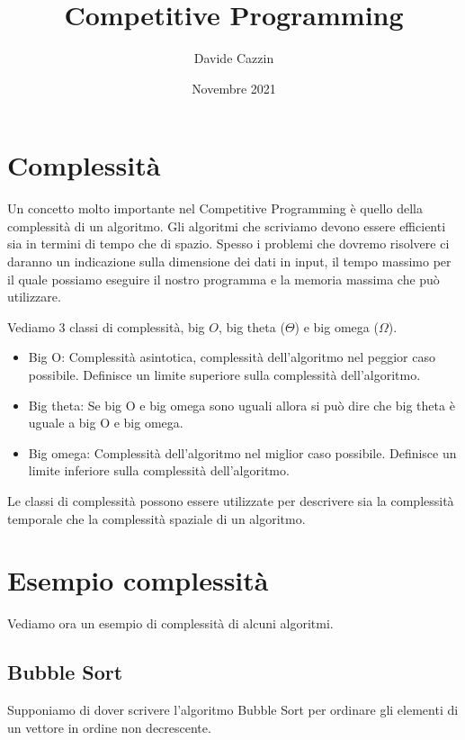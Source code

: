 \documentclass{article}
\title{Competitive Programming}
\author{Davide Cazzin}
\date{Novembre 2021}
\begin{document}
\maketitle

\section{Complessità}

Un concetto molto importante nel Competitive Programming è quello della complessità di un algoritmo. Gli algoritmi che scriviamo devono essere efficienti sia in termini di tempo che di spazio. 
Spesso i problemi che dovremo risolvere ci daranno un indicazione sulla dimensione dei dati in input, il tempo massimo per il quale possiamo eseguire il nostro programma e la memoria massima che può utilizzare.

Vediamo 3 classi di complessità, big $O$, big theta ($\Theta$) e big omega ($\Omega$).
\begin{itemize}
  \item Big O: Complessità asintotica, complessità dell'algoritmo nel peggior caso possibile. Definisce un limite superiore sulla complessità dell'algoritmo.
  \item Big theta: Se big O e big omega sono uguali allora si può dire che big theta è uguale a big O e big omega.
  \item Big omega: Complessità dell'algoritmo nel miglior caso possibile. Definisce un limite inferiore sulla complessità dell'algoritmo.
\end{itemize}

Le classi di complessità possono essere utilizzate per descrivere sia la complessità temporale che la complessità spaziale di un algoritmo.

\section{Esempio complessità}

Vediamo ora un esempio di complessità di alcuni algoritmi.



\subsection{Bubble Sort}

Supponiamo di dover scrivere l'algoritmo Bubble Sort per ordinare gli elementi di un vettore in ordine non decrescente.
\end{document}
